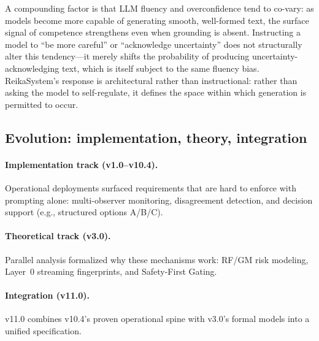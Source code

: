 \documentclass[11pt,a4paper]{article}
\begin{document}
A compounding factor is that LLM fluency and overconfidence tend to co-vary: as models become
more capable of generating smooth, well-formed text, the surface signal of competence strengthens
even when grounding is absent. Instructing a model to ``be more careful'' or ``acknowledge
uncertainty'' does not structurally alter this tendency---it merely shifts the probability of
producing uncertainty-acknowledging text, which is itself subject to the same fluency bias.
ReikaSystem's response is architectural rather than instructional: rather than asking the model
to self-regulate, it defines the space within which generation is permitted to occur.

\subsection{Evolution: implementation, theory, integration}

\paragraph{Implementation track (v1.0--v10.4).}
Operational deployments surfaced requirements that are hard to enforce with prompting alone:
multi-observer monitoring, disagreement detection, and decision support (e.g., structured
options A/B/C).

\paragraph{Theoretical track (v3.0).}
Parallel analysis formalized why these mechanisms work: RF/GM risk modeling, Layer~0
streaming fingerprints, and Safety-First Gating.

\paragraph{Integration (v11.0).}
v11.0 combines v10.4's proven operational spine with v3.0's formal models into a unified
specification.
\end{document}
